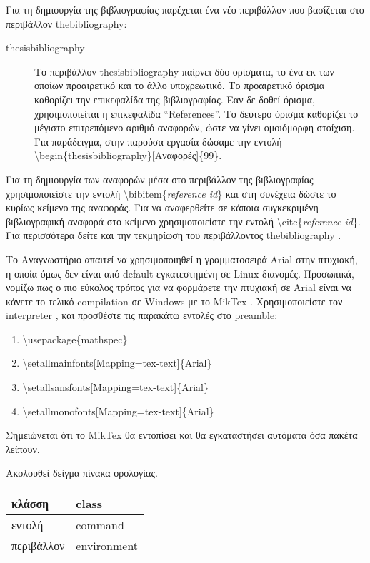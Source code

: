 \documentclass{dithesis}
\begin{document}
Για τη δημιουργία της βιβλιογραφίας παρέχεται ένα νέο περιβάλλον που
βασίζεται στο περιβάλλον thebibliography:
\begin{description}
\item[thesisbibliography]
  Το περιβάλλον thesisbibliography παίρνει δύο ορίσματα, το ένα εκ των οποίων
  προαιρετικό και το άλλο υποχρεωτικό.
  Το προαιρετικό όρισμα καθορίζει την επικεφαλίδα της βιβλιογραφίας.
  Εαν δε δοθεί όρισμα, χρησιμοποιείται η επικεφαλίδα ``References''.
  Το δεύτερο όρισμα καθορίζει το μέγιστο επιτρεπόμενο αριθμό αναφορών, ώστε
  να γίνει ομοιόμορφη στοίχιση.
  Για παράδειγμα, στην παρούσα εργασία δώσαμε την εντολή
  \textbackslash{begin}\{thesisbibliography\}{[Αναφορές]}\{99\}.
\end{description}

Για τη δημιουργία των αναφορών μέσα στο περιβάλλον της βιβλιογραφίας 
χρησιμοποιείστε την εντολή \textbackslash{bibitem}\{\textit{reference id}\} και
στη συνέχεια δώστε το κυρίως κείμενο της αναφοράς.
Για να αναφερθείτε σε κάποια συγκεκριμένη βιβλιογραφική αναφορά στο κείμενο
χρησιμοποιείστε την εντολή \textbackslash{cite}\{\textit{reference id}\}.
Για περισσότερα δείτε και την τεκμηρίωση του περιβάλλοντος thebibliography
\cite{Bibliography}.

Το Αναγνωστήριο απαιτεί να χρησιμοποιηθεί η γραμματοσειρά Arial στην πτυχιακή,
η οποία όμως δεν είναι από default εγκατεστημένη σε Linux διανομές.
Προσωπικά, νομίζω πως ο πιο εύκολος τρόπος για να φορμάρετε την πτυχιακή σε
Arial είναι να κάνετε το τελικό compilation σε Windows με το MikTex 
\cite{Miktex}.
Χρησιμοποιείστε τον interpreter \XeLaTeX{}, και προσθέστε τις παρακάτω
εντολές στο preamble:
\begin{enumerate}
\item
  \textbackslash{usepackage}\{mathspec\}
\item
  \textbackslash{setallmainfonts}{[Mapping=tex-text]}\{Arial\}
\item
  \textbackslash{setallsansfonts}{[Mapping=tex-text]}\{Arial\}
\item
  \textbackslash{setallmonofonts}{[Mapping=tex-text]}\{Arial\}
\end{enumerate}

Σημειώνεται ότι το MikTex θα εντοπίσει και θα εγκαταστήσει αυτόματα όσα πακέτα 
λείπουν.

\begin{thesisterminology}
Ακολουθεί δείγμα πίνακα ορολογίας.

\begin{tabularx}{\textwidth}{|X|X|}
  \hline
  κλάσση     & class \\
  \hline
  εντολή     & command \\
  \hline
  περιβάλλον & environment \\
  \hline
\end{tabularx}

\end{thesisterminology}
\end{document}
